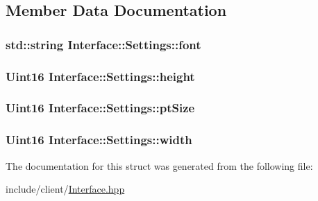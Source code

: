 \subsection{Member Data Documentation}
\hypertarget{structInterface_1_1Settings_a87fdab4dc452a1c560ee51216fb521e9}{
\subsubsection[{font}]{\setlength{\rightskip}{0pt plus 5cm}std\-::string Interface\-::\-Settings\-::font}}\label{structInterface_1_1Settings_a87fdab4dc452a1c560ee51216fb521e9}
\hypertarget{structInterface_1_1Settings_a922dfb8793d733f02b1245867c2d3085}{
\subsubsection[{height}]{\setlength{\rightskip}{0pt plus 5cm}Uint16 Interface\-::\-Settings\-::height}}\label{structInterface_1_1Settings_a922dfb8793d733f02b1245867c2d3085}
\hypertarget{structInterface_1_1Settings_a49df66cdf0a0a5f4770c7ba1163a74d2}{
\subsubsection[{pt\-Size}]{\setlength{\rightskip}{0pt plus 5cm}Uint16 Interface\-::\-Settings\-::pt\-Size}}\label{structInterface_1_1Settings_a49df66cdf0a0a5f4770c7ba1163a74d2}
\hypertarget{structInterface_1_1Settings_aa98d45f64620684fe538305a40f8a7d7}{
\subsubsection[{width}]{\setlength{\rightskip}{0pt plus 5cm}Uint16 Interface\-::\-Settings\-::width}}\label{structInterface_1_1Settings_aa98d45f64620684fe538305a40f8a7d7}


The documentation for this struct was generated from the following file\-:\begin{DoxyCompactItemize}
\item 
include/client/\hyperlink{Interface_8hpp}{Interface.\-hpp}\end{DoxyCompactItemize}
